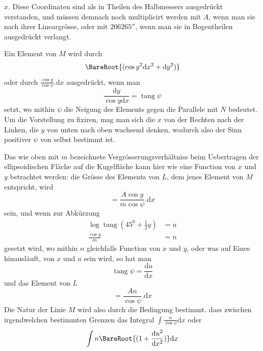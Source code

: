 %
\(x\). Diese Coordinaten sind als in Theilen des Halbmessers ausgedrückt verstanden, und müssen demnach noch multiplicirt werden mit \(A\), wenn man sie nach ihrer Lineargrösse, oder mit \(206265''\), wenn man sie in Bogentheilen ausgedrückt verlangt.

Ein Element von \(M\) wird durch
\[
\BareRoot{(\cos y^2\mathrm{d}x^2+\mathrm{d}y^2)}
\]
oder durch \(\frac{\cos y}{\cos\psi}\mathord{.}\mathrm{d}x\) ausgedrückt, wenn man
\[
\frac{\mathrm{d}y}{\cos y\mathrm{d}x}=\operatorname{tang}\psi
\]
setzt, wo mithin \(\psi\) die Neigung des Elements gegen die Parallele mit \(N\) bedeutet. Um die Vorstellung zu fixiren, mag man sich die \(x\) von der Rechten nach der Linken, die \(y\) von unten nach oben wachsend denken, wodurch also der Sinn positiver \(\psi\) von selbst bestimmt ist.

Das wie oben mit \(m\) bezeichnete Vergrösserungsverhältniss beim Uebertragen der ellipsoidischen Fläche auf die Kugelfläche kann hier wie eine Function von \(x\) und \(y\) betrachtet werden: die Grösse des Elements von \(L\), dem jenes Element von \(M\) entspricht, wird
\[
=\frac{A\cos y}{m\cos\psi}\mathord{.}\mathrm{d}x
\]
sein, und wenn zur Abkürzung
\[
\begin{aligned}
\log\operatorname{tang}(45^0+\tfrac{1}{2}y)&=u\\
\frac{\cos y}{m}&=n
\end{aligned}
\]
gesetzt wird, wo mithin \(n\) gleichfalls Function von \(x\) und \(y\), oder was auf Eines hinausläuft, von \(x\) und \(u\) sein wird, so hat man
\[
\operatorname{tang}\psi=\frac{\mathrm{d}u}{\mathrm{d}x}
\]
und das Element von \(L\)
\[
=\frac{An}{\cos\psi}\mathord{.}\mathrm{d}x
\]
\indent Die Natur der Linie \(M\) wird also durch die Bedingung bestimmt. dass zwischen irgendwelchen bestimmten Grenzen das Integral \(\int\frac{n}{\cos\psi}\mathrm{d}x\) oder
\[
\int n\BareRoot{(1+\frac{\mathrm{d}u^2}{\mathrm{d}x^2})}\mathrm{d}x
\]
